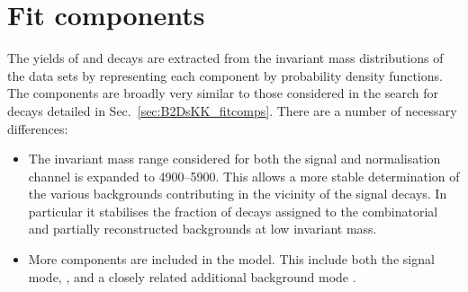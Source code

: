 



\section{Fit components}
\label{sec:B2DsPhi_fitcomponents}

The yields of \decay{\Bp}{\Dsp\phiz} and \decay{\Bp}{\Dsp\Dzb} decays are extracted from the invariant mass distributions of the data sets by representing each component by probability density functions. The components are broadly very similar to those considered in the search for \decay{\Bp}{\Dsp\Kp\Km} decays detailed in Sec.~\ref{sec:B2DsKK_fitcomps}. There are a number of necessary differences:
\begin{itemize}
\item The \Bp invariant mass range considered for both the signal and normalisation channel is expanded to 4900--5900\mevcc. This allows a more stable determination of the various backgrounds contributing in the vicinity of the signal decays. In particular it stabilises the fraction of decays assigned to the combinatorial and partially reconstructed backgrounds at low \Bp invariant mass.   
\item More components are included in the model. This include both the signal mode, \decay{\Bp}{\Dsp\phiz}, and a closely related additional background mode \decay{\Bp}{\Dssp\phiz}. 
\end{itemize}


